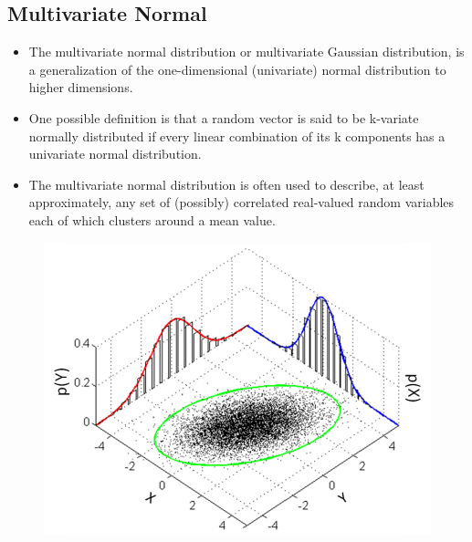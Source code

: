 \documentclass[]{article}
\begin{document}
\subsection{Multivariate Normal}
{\large
\begin{itemize}
\item The multivariate normal distribution or multivariate Gaussian distribution, is a generalization of the one-dimensional (univariate) normal distribution to higher dimensions.\item One possible definition is that a random vector is said to be k-variate normally distributed if every linear combination of its k components has a univariate normal distribution. 
\item The multivariate normal distribution is often used to describe, at least approximately, any set of (possibly) correlated real-valued random variables each of which clusters around a mean value.
\end{itemize}
}
\begin{figure}[h!]
\centering
\includegraphics[width=0.8\linewidth]{./793px-MultivariateNormal}
\caption{}
\label{fig:793px-MultivariateNormal}
\end{figure}

\newpage
\end{document}
